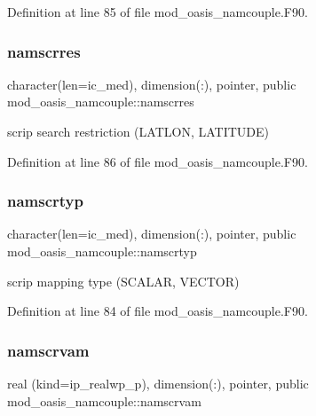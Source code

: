 Definition at line 85 of file mod\+\_\+oasis\+\_\+namcouple.\+F90.

\mbox{\label{namespacemod__oasis__namcouple_a6a95ddbbbc615e0257d93d05e4546239}} 
\subsubsection{\texorpdfstring{namscrres}{namscrres}}
{\footnotesize\ttfamily character(len=ic\+\_\+med), dimension(\+:), pointer, public mod\+\_\+oasis\+\_\+namcouple\+::namscrres}



scrip search restriction (L\+A\+T\+L\+ON, L\+A\+T\+I\+T\+U\+DE) 



Definition at line 86 of file mod\+\_\+oasis\+\_\+namcouple.\+F90.

\mbox{\label{namespacemod__oasis__namcouple_a8ddbaabd22bbf485888b1df5f3578909}} 
\subsubsection{\texorpdfstring{namscrtyp}{namscrtyp}}
{\footnotesize\ttfamily character(len=ic\+\_\+med), dimension(\+:), pointer, public mod\+\_\+oasis\+\_\+namcouple\+::namscrtyp}



scrip mapping type (S\+C\+A\+L\+AR, V\+E\+C\+T\+OR) 



Definition at line 84 of file mod\+\_\+oasis\+\_\+namcouple.\+F90.

\mbox{\label{namespacemod__oasis__namcouple_a45b410743ce74a9824d44b329ba323ba}} 
\subsubsection{\texorpdfstring{namscrvam}{namscrvam}}
{\footnotesize\ttfamily real (kind=ip\+\_\+realwp\+\_\+p), dimension(\+:), pointer, public mod\+\_\+oasis\+\_\+namcouple\+::namscrvam}



